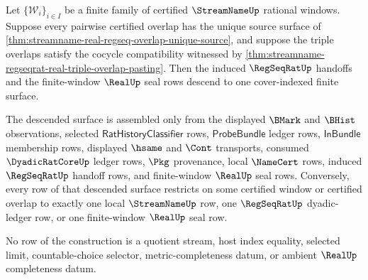 \begin{theorem}
\label{thm:streamname-regseqrat-real-finite-cover-descent-exactness}
Let $\{\mathcal{W}_i\}_{i\in I}$ be a finite family of certified
$\StreamNameUp$ rational windows. Suppose every pairwise certified overlap
has the unique source surface of
\autoref{thm:streamname-real-regseq-overlap-unique-source}, and suppose the
triple overlaps satisfy the cocycle compatibility witnessed by
\autoref{thm:streamname-regseqrat-real-triple-overlap-pasting}. Then the
induced $\RegSeqRatUp$ handoffs and the finite-window $\RealUp$ seal rows
descend to one cover-indexed finite surface.

The descended surface is assembled only from the displayed $\BMark$ and
$\BHist$ observations, selected $\mathsf{RatHistoryClassifier}$ rows,
$\mathsf{ProbeBundle}$ ledger rows, $\mathsf{InBundle}$ membership rows,
displayed $\hsame$ and $\Cont$ transports, consumed $\DyadicRatCoreUp$
ledger rows, $\Pkg$ provenance, local $\NameCert$ rows, induced
$\RegSeqRatUp$ handoff rows, and finite-window $\RealUp$ seal rows.
Conversely, every row of that descended surface restricts on some certified
window or certified overlap to exactly one local $\StreamNameUp$ row, one
$\RegSeqRatUp$ dyadic-ledger row, or one finite-window $\RealUp$ seal row.

No row of the construction is a quotient stream, host index equality, selected
limit, countable-choice selector, metric-completeness datum, or ambient
$\RealUp$ completeness datum.
\end{theorem}
